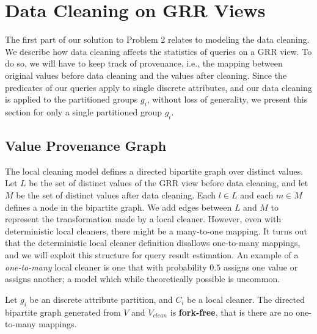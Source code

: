 \section{Data Cleaning on GRR Views}
The first part of our solution to Problem 2 relates to modeling the data cleaning.
We describe how data cleaning affects the statistics of queries on a GRR view.
To do so, we will have to keep track of provenance, i.e.,  the mapping between original values before data cleaning and the values after cleaning.
Since the predicates of our queries apply to single discrete attributes, and our data cleaning is applied to the partitioned groups $g_i$, without loss of generality, we present this section for only a single partitioned group $g_i$.

\subsection{Value Provenance Graph}
The local cleaning model defines a directed bipartite graph over distinct values.
Let $L$ be the set of distinct values of the GRR view before data cleaning, and let $M$ be the set of distinct values after data cleaning. Each $l \in L$ and each $m \in M$ defines a node in the bipartite graph. 
We add edges between $L$ and $M$ to represent the transformation made by a local cleaner.
However, even with deterministic local cleaners, there might be a many-to-one mapping.
It turns out that the deterministic local cleaner definition disallows one-to-many mappings, and we will exploit this structure for query result estimation.
An example of a \emph{one-to-many} local cleaner is one that with probability $0.5$ assigns one value or assigns another; a model which while theoretically possible is uncommon.

\begin{lemma}
Let $g_i$ be an discrete attribute partition, and $C_i$ be a local cleaner. The directed bipartite graph generated from $V$ and $V_{clean}$ is \textbf{fork-free}, that is there are no one-to-many mappings.
\end{lemma}

